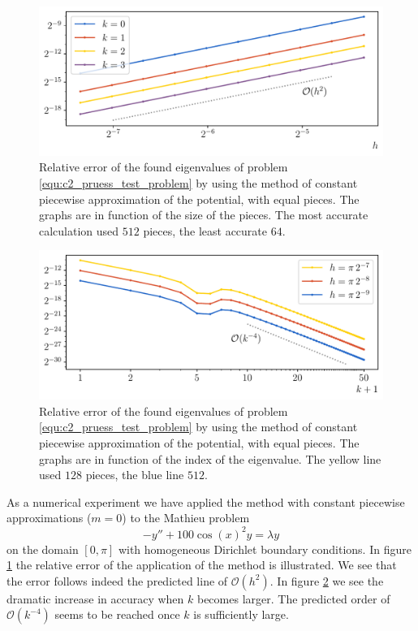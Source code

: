 \begin{figure}
    \begin{center}
        \includegraphics[width=\textwidth]{img/chapter2/pruess_h_error.pdf}
    \end{center}
    \caption{Relative error of the found eigenvalues of problem \eqref{equ:c2_pruess_test_problem} by using the method of constant piecewise approximation of the potential, with equal pieces. The graphs are in function of the size of the pieces. The most accurate calculation used $512$ pieces, the least accurate $64$.}
    \label{fig:c2_pruess_h_error}
\end{figure}

\begin{figure}
    \begin{center}
        \includegraphics[width=\textwidth]{img/chapter2/pruess_k_error.pdf}
    \end{center}
    \caption{Relative error of the found eigenvalues of problem \eqref{equ:c2_pruess_test_problem} by using the method of constant piecewise approximation of the potential, with equal pieces. The graphs are in function of the index of the eigenvalue. The yellow line used $128$ pieces, the blue line $512$.}
    \label{fig:c2_pruess_k_error}
\end{figure}

As a numerical experiment we have applied the method with constant piecewise approximations ($m=0$) to the Mathieu problem
\begin{equation}\label{equ:c2_pruess_test_problem}
    -y'' + 100 \cos(x)^2 y = \lambda y
\end{equation}
on the domain $[0, \pi]$ with homogeneous Dirichlet boundary conditions. In figure \ref{fig:c2_pruess_h_error} the relative error of the application of the method is illustrated. We see that the error follows indeed the predicted line of $\mathcal{O}(h^2)$. In figure \ref{fig:c2_pruess_k_error} we see the dramatic increase in accuracy when $k$ becomes larger. The predicted order of $\mathcal{O}(k^{-4})$ seems to be reached once $k$ is sufficiently large.


